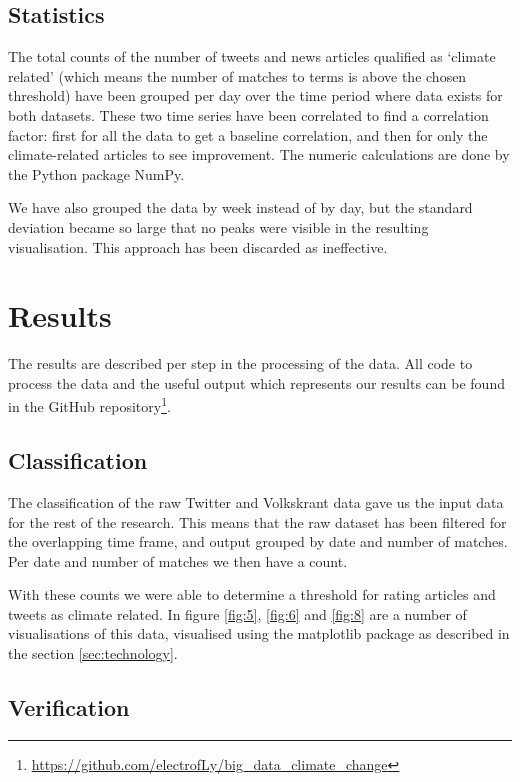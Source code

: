 \documentclass[paper=a4, fontsize=9px]{scrartcl} %
\numberwithin{equation}{section} %
\numberwithin{figure}{section} %
\numberwithin{table}{section} %
\begin{document}
\begin{multicols}{2}
\subsection{Statistics}

The total counts of the number of tweets and news articles qualified as `climate related’ (which means the number of matches to terms is above the chosen threshold) have been grouped per day over the time period where data exists for both datasets. These two time series have been correlated to find a correlation factor: first for all the data to get a baseline correlation, and then for only the climate-related articles to see improvement. The numeric calculations are done by the Python package NumPy.

We have also grouped the data by week instead of by day, but the standard deviation became so large that no peaks were visible in the resulting visualisation. This approach has been discarded as ineffective.

\section{Results}\label{sec:results}

The results are described per step in the processing of the data. All code to process the data and the useful output which represents our results can be found in the GitHub repository\footnote{\url{https://github.com/electrofLy/big\_data\_climate\_change}}.


\subsection{Classification}

The classification of the raw Twitter and Volkskrant data gave us the input data for the rest of the research. This means that the raw dataset has been filtered for the overlapping time frame, and output grouped by date and number of matches. Per date and number of matches we then have  a count. 

With these counts we were able to determine a threshold for rating articles and tweets as climate related. In figure \ref{fig:5}, \ref{fig:6} and \ref{fig:8} are a number of visualisations of this data, visualised using the matplotlib package as described in the section \ref{sec:technology}.


\subsection{Verification}


\end{multicols}
\end{document}
